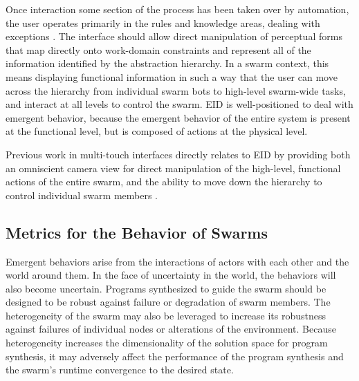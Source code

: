 \documentclass[]{article}
\begin{document}
Once interaction some section of the process has been taken over by automation, the user operates primarily in the rules and knowledge areas, dealing with exceptions \cite{vicente2002ecological}.
The interface should allow direct manipulation of perceptual forms that map directly onto work-domain constraints and represent all of the information identified by the abstraction hierarchy. 
In a swarm context, this means displaying functional information in such a way that the user can move across the hierarchy from individual swarm bots to high-level swarm-wide tasks, and interact at all levels to control the swarm. 
EID is well-positioned to deal with emergent behavior, because the emergent behavior of the entire system is present at the functional level, but is composed of actions at the physical level.  

Previous work in multi-touch interfaces directly relates to EID by providing both an omniscient camera view for direct manipulation of the high-level, functional actions of the entire swarm, and the ability to move down the hierarchy to control individual swarm members \cite{Micire:2009:ANG:1731903.1731912}.


\subsection{Metrics for the Behavior of Swarms}

Emergent behaviors arise from the interactions of actors with each other and the world around them. 
In the face of uncertainty in the world, the behaviors will also become uncertain. 
Programs synthesized to guide the swarm should be designed to be robust against failure or degradation of swarm members. 
The heterogeneity of the swarm may also be leveraged to increase its robustness against failures of individual nodes or alterations of the environment. 
Because heterogeneity increases the dimensionality of the solution space for program synthesis, it may adversely affect the performance of the program synthesis and the swarm's runtime convergence to the desired state.
\end{document}
